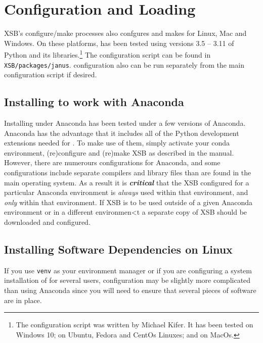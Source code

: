 \section{Configuration and Loading}

XSB's configure/make processes also confgures and makes \janus{} for 
Linux, Mac and Windows.  On these platforms, \janusplg{} has been
tested using versions 3.5 -- 3.11 of Python and its
libraries.\footnote{The \janusplg{} configuration script was written
by Michael Kifer.  It has been tested on Windows 10; on Ubuntu, Fedora
and CentOs Linuxes; and on MacOs.}  The \janusplg configuration script
can be found in {\tt XSB/packages/janus}.  \janusplg configuration
also can be run separately from the main configuration script if
desired.

\subsection{Installing \janusplg{} to work with Anaconda}

Installing \janusplg under Anaconda has been tested under a few
versions of Anaconda.  Anaconda has the advantage that it includes all
of the Python development extensions needed for \janusplg.  To make
use of them, simply activate your conda environment, (re)configure and
(re)make XSB as described in the manual.  However, there are numerours
configurations for Anaconda, and some configurations include separate
compilers and library files than are found in the main operating
system.  As a result it is {\em {\bf critical}} that the XSB
configured for a particular Anaconda environment is {\em always} used
within that environment, and {\em only} within that environment.  If
XSB is to be used outside of a given Anaconda environment or in a
different environmen<t a separate copy of XSB should be downloaded and
configured.

\subsection{Installing Software Dependencies on Linux}\label{sec:janus-linux}

If you use {\tt venv} as your environment manager or if you are
configuring a system installation of \janusplg{} for several users,
configuration may be slightly more complicated than using Anaconda
since you will need to ensure that several pieces of software are in
place.


